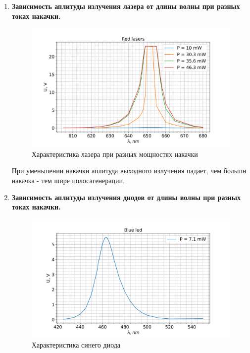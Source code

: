 \documentclass[a4paper]{article}
\begin{document}
        \begin{enumerate}
            \item \textbf{Зависимость аплитуды излучения лазера от длины волны при разных токах накачки.} \par
        
                \begin{figure}[H]
                    \begin{center}
                        \includegraphics[scale=0.5]{spectr_red_lasers.png}
                        \caption{Характеристика лазера при разных мощностях накачки}
                        \label{lasers}
                    \end{center}
                \end{figure}
                
                При уменьшении накачки аплитуда выходного излучения падает, чем большн накачка - тем шире полосагенерации.
                
            \item \textbf{Зависимость аплитуды излучения диодов от длины волны при разных токах накачки.} \par
                
                \begin{figure}[H]
                    \begin{center}
                        \includegraphics[scale=0.5]{spectr_blue_led.png}
                        \caption{Характеристика синего диода}
                        \label{blue}
                    \end{center}
                \end{figure}


\end{enumerate}
\end{document}
